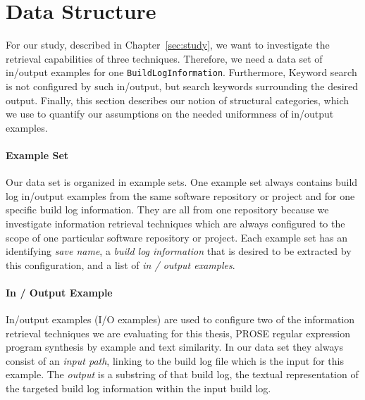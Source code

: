 \documentclass[\myrootdir/main.tex]{subfiles}
\begin{document}


\section{Data Structure}
For our study, described in Chapter~\ref{sec:study}, we want to investigate the retrieval capabilities of three techniques. Therefore, we need a data set of in/output examples for one \texttt{BuildLogInformation}. Furthermore, Keyword search is not configured by such in/output, but search keywords surrounding the desired output. Finally, this section describes our notion of structural categories, which we use to quantify our assumptions on the needed uniformness of in/output examples.

\paragraph{Example Set}
\label{sec:example-set}
Our data set is organized in example sets. One example set always contains build log in/output examples from the same software repository or project and for one specific build log information. They are all from one repository because we investigate information retrieval techniques which are always configured to the scope of one particular software repository or project.
Each example set has an identifying \emph{save name}, a \emph{build log information} that is desired to be extracted by this configuration, and a list of \emph{in / output examples}.

\paragraph{In / Output Example}
In/output examples (I/O examples) are used to configure two of the information retrieval techniques we are evaluating for this thesis, PROSE regular expression program synthesis by example and text similarity.
In our data set they always consist of an \emph{input path}, linking to the build log file which is the input for this example.
The \emph{output} is a substring of that build log, the textual representation of the targeted build log information within the input build log.
\end{document}
